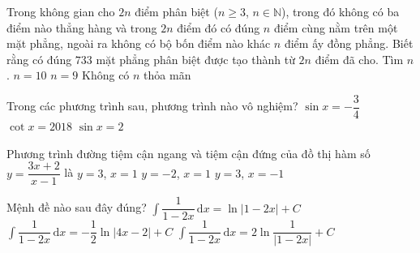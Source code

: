 \begin{ex}%
Trong không gian cho $2n$ điểm phân biệt ($n\ge 3$, $n\in\mathbb{N}$), trong đó không có ba điểm nào thẳng hàng và trong $2n$ điểm đó có đúng $n$ điểm cùng nằm trên một mặt phẳng, ngoài ra không có bộ bốn điểm nào khác $n$ điểm ấy đồng phẳng. Biết rằng có đúng $733$ mặt phẳng phân biệt được tạo thành từ $2n$ điểm đã cho. Tìm $n$.
{$n=10$}
{\True $n=9$}
{Không có $n$ thỏa mãn}
\end{ex}

\begin{ex}%
Trong các phương trình sau, phương trình nào vô nghiệm?
{$\sin x=-\dfrac{3}{4}$}
{$\cot x=2018$}
{\True $\sin x=2$}
\end{ex}

\begin{ex}%
Phương trình đường tiệm cận ngang và tiệm cận đứng của đồ thị hàm số $y=\dfrac{3x+2}{x-1}$ là
{\True $y=3$, $x=1$}
{$y=-2$, $x=1$}
{$y=3$, $x=-1$}
\end{ex}

\begin{ex}%
Mệnh đề nào sau đây đúng?
{$\displaystyle\int\dfrac{1}{1-2x}\mathrm{\,d}x=\ln\left|1-2x\right|+C$}
{\True $\displaystyle\int\dfrac{1}{1-2x}\mathrm{\,d}x=-\dfrac{1}{2}\ln\left|4x-2\right|+C$}
{$\displaystyle\int\dfrac{1}{1-2x}\mathrm{\,d}x=2\ln\dfrac{1}{\left|1-2x\right|}+C$}
\end{ex}

